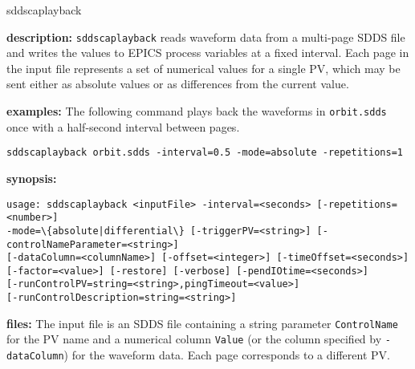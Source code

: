 %
%
\begin{sddsprog}{sddscaplayback}
\item \textbf{description:}
\verb+sddscaplayback+ reads waveform data from a multi-page SDDS file and writes the values to
EPICS process variables at a fixed interval. Each page in the input file represents a set of
numerical values for a single PV, which may be sent either as absolute values or as differences
from the current value.

\item \textbf{examples:}
The following command plays back the waveforms in \verb+orbit.sdds+ once with a half-second
interval between pages.
\begin{verbatim}
sddscaplayback orbit.sdds -interval=0.5 -mode=absolute -repetitions=1
\end{verbatim}

\item \textbf{synopsis:}
\begin{verbatim}
usage: sddscaplayback <inputFile> -interval=<seconds> [-repetitions=<number>]
-mode=\{absolute|differential\} [-triggerPV=<string>] [-controlNameParameter=<string>]
[-dataColumn=<columnName>] [-offset=<integer>] [-timeOffset=<seconds>]
[-factor=<value>] [-restore] [-verbose] [-pendIOtime=<seconds>]
[-runControlPV=string=<string>,pingTimeout=<value>]
[-runControlDescription=string=<string>]
\end{verbatim}

\item \textbf{files:}
The input file is an SDDS file containing a string parameter \verb+ControlName+ for the PV name
and a numerical column \verb+Value+ (or the column specified by \verb+-dataColumn+) for the
waveform data. Each page corresponds to a different PV.


\end{sddsprog}
